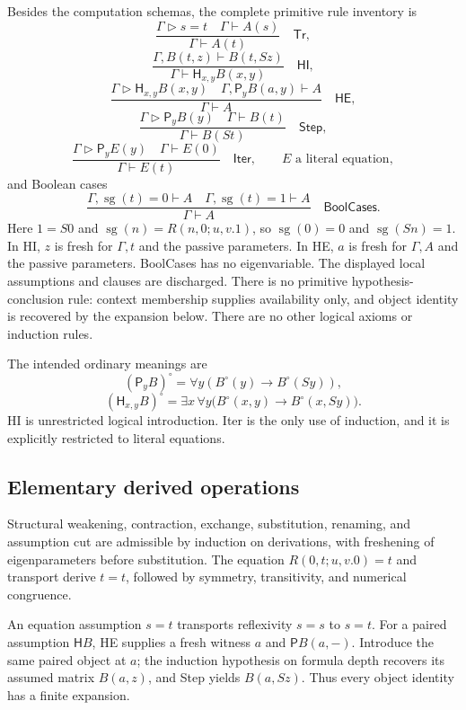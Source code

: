 \documentclass[11pt,letterpaper]{article}
\theoremstyle{definition}\newtheorem{definition}[theorem]{Definition}
\theoremstyle{remark}\newtheorem{remark}[theorem]{Remark}
\begin{document}
Besides the computation schemas, the complete primitive rule inventory is
\[
 \frac{\Gamma\mathrel{\triangleright}s=t\quad
       \Gamma\vdash A(s)}{\Gamma\vdash A(t)}
 \quad\mathsf{Tr},
\]
\[
 \frac{\Gamma,B(t,z)\vdash B(t,Sz)}
      {\Gamma\vdash\mathsf H_{x,y}B(x,y)}
 \quad\mathsf{HI},
\]
\[
 \frac{\Gamma\mathrel{\triangleright}\mathsf H_{x,y}B(x,y)
       \quad\Gamma,\mathsf P_yB(a,y)\vdash A}
      {\Gamma\vdash A}
 \quad\mathsf{HE},
\]
\[
 \frac{\Gamma\mathrel{\triangleright}\mathsf P_yB(y)
       \quad\Gamma\vdash B(t)}
      {\Gamma\vdash B(St)}
 \quad\mathsf{Step},
\]
\[
 \frac{\Gamma\mathrel{\triangleright}\mathsf P_yE(y)
       \quad\Gamma\vdash E(0)}
      {\Gamma\vdash E(t)}
 \quad\mathsf{Iter},
 \qquad E\text{ a literal equation},
\]
and Boolean cases
\[
 \frac{\Gamma,\operatorname{sg}(t)=0\vdash A\quad
       \Gamma,\operatorname{sg}(t)=1\vdash A}
      {\Gamma\vdash A}
 \quad\mathsf{BoolCases}.
\]
Here $1=S0$ and $\operatorname{sg}(n)=R(n,0;u,v.1)$, so
$\operatorname{sg}(0)=0$ and $\operatorname{sg}(Sn)=1$.
In HI, $z$ is fresh for $\Gamma,t$ and the passive parameters.
In HE, $a$ is fresh for $\Gamma,A$ and the passive parameters.
BoolCases has no eigenvariable.  The displayed local
assumptions and clauses are discharged.  There is no primitive
hypothesis-conclusion rule: context membership supplies availability
only, and object identity is recovered by the expansion below.
There are no other logical axioms or induction rules.

The intended ordinary meanings are
\[
 (\mathsf P_yB)^\circ=\forall y(B^\circ(y)\to B^\circ(Sy)),
\]
\[
 (\mathsf H_{x,y}B)^\circ
   =\exists x\,\forall y\bigl(B^\circ(x,y)\to B^\circ(x,Sy)\bigr).
 \tag{Meaning}
\]
HI is unrestricted logical introduction.  Iter is the only use of
induction, and it is explicitly restricted to literal equations.

\subsection{Elementary derived operations}

Structural weakening, contraction, exchange, substitution, renaming,
and assumption cut are admissible by induction on derivations, with
freshening of eigenparameters before substitution.  The equation
$R(0,t;u,v.0)=t$ and transport derive $t=t$, followed by symmetry,
transitivity, and numerical congruence.

An equation assumption $s=t$ transports reflexivity $s=s$ to $s=t$.
For a paired assumption
$\mathsf H B$, HE supplies a fresh witness $a$ and $\mathsf P B(a,-)$.
Introduce the same paired object at $a$; the induction hypothesis on
formula depth recovers its assumed matrix $B(a,z)$, and Step yields
$B(a,Sz)$.  Thus every object identity has a finite expansion.
\end{document}
